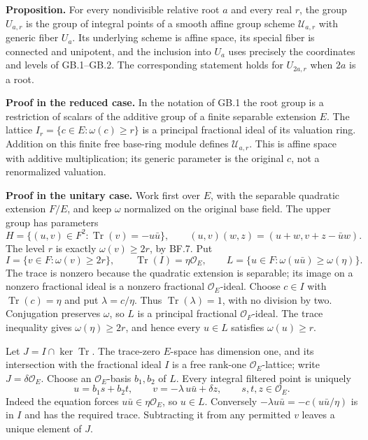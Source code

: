 \documentclass[
  11pt,
]{article}
\begin{document}
\textbf{Proposition.} For every nondivisible relative root \(a\) and
every real \(r\), the group \(U_{a,r}\) is the group of integral points
of a smooth affine group scheme \(\mathcal U_{a,r}\) with generic fiber
\(U_a\). Its underlying scheme is affine space, its special fiber is
connected and unipotent, and the inclusion into \(U_a\) uses precisely
the coordinates and levels of GB.1--GB.2. The corresponding statement
holds for \(U_{2a,r}\) when \(2a\) is a root.

\textbf{Proof in the reduced case.} In the notation of GB.1 the root
group is a restriction of scalars of the additive group of a finite
separable extension \(E\). The lattice
\(I_r=\{c\in E:\omega(c)\geq r\}\) is a principal fractional ideal of
its valuation ring. Addition on this finite free base-ring module
defines \(\mathcal U_{a,r}\). This is affine space with additive
multiplication; its generic parameter is the original \(c\), not a
renormalized valuation.

\textbf{Proof in the unitary case.} Work first over \(E\), with the
separable quadratic extension \(F/E\), and keep \(\omega\) normalized on
the original base field. The upper group has parameters \[
 H=\{(u,v)\in F^2:\operatorname {Tr}(v)=-u\bar u\},\qquad
 (u,v)(w,z)=(u+w,v+z-\bar u w).
 \tag{GB.23}
\] The level \(r\) is exactly \(\omega(v)\geq2r\), by BF.7. Put \[
 I=\{v\in F:\omega(v)\geq2r\},\qquad
 \operatorname {Tr}(I)=\eta\mathcal O_E,\qquad
 L=\{u\in F:\omega(u\bar u)\geq\omega(\eta)\}.
 \tag{GB.24}
\] The trace is nonzero because the quadratic extension is separable;
its image on a nonzero fractional ideal is a nonzero fractional
\(\mathcal O_E\)-ideal. Choose \(c\in I\) with
\(\operatorname {Tr}(c)=\eta\) and put \(\lambda=c/\eta\). Thus
\(\operatorname {Tr}(\lambda)=1\), with no division by two. Conjugation
preserves \(\omega\), so \(L\) is a principal fractional
\(\mathcal O_F\)-ideal. The trace inequality gives
\(\omega(\eta)\geq2r\), and hence every \(u\in L\) satisfies
\(\omega(u)\geq r\).

Let \(J=I\cap\ker\operatorname {Tr}\). The trace-zero \(E\)-space has
dimension one, and its intersection with the fractional ideal \(I\) is a
free rank-one \(\mathcal O_E\)-lattice; write \(J=\delta\mathcal O_E\).
Choose an \(\mathcal O_E\)-basis \(b_1,b_2\) of \(L\). Every integral
filtered point is uniquely \[
 u=b_1s+b_2t,\qquad v=-\lambda\,u\bar u+\delta z,\qquad
 s,t,z\in\mathcal O_E.
 \tag{GB.25}
\] Indeed the equation forces \(u\bar u\in\eta\mathcal O_E\), so
\(u\in L\). Conversely \(-\lambda u\bar u=-c(u\bar u/\eta)\) is in \(I\)
and has the required trace. Subtracting it from any permitted \(v\)
leaves a unique element of \(J\).
\end{document}
